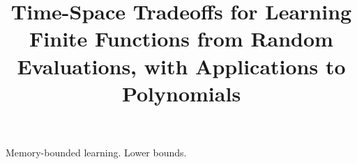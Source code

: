 \documentclass[final]{colt2018} %
\title[Time-Space Tradeoffs for Learning Finite Functions]{Time-Space Tradeoffs for Learning Finite Functions from Random Evaluations,
with Applications to Polynomials}
\newcommand{\1}{\mbox{\textbf{1}}}
\begin{document}
\maketitle


\begin{keywords}
Memory-bounded learning.  Lower bounds.  
\end{keywords}







\newpage

%
%
%
%
%
\end{document}
